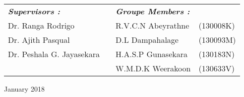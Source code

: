 \documentclass[12pt,a4paper,margin=1in]{article}
\begin{document}
\begin{titlepage}

\begin{flushleft}
\begin{tabular}{ l l l l}
\textbf{\textit{Supervisors :}} & &  \textbf{\textit{Groupe Members :}}\\[3pt]
Dr. Ranga Rodrigo & \hspace{20mm} & R.V.C.N Abeyrathne &(130008K)\\[2pt]
Dr. Ajith Pasqual & \hspace{20mm} & D.L Dampahalage & (130093M)\\[2pt]
Dr. Peshala G. Jayasekara & \hspace{20mm} & H.A.S.P Gunasekara & (130183N)\\[2pt]
\hspace{20mm} & \hspace{20mm} & W.M.D.K Weerakoon &(130633V)
\end{tabular}
\end{flushleft}

\vspace{2cm}
\fontsize{12pt}{12}\selectfont January 2018\\[1cm]


\vfill %

\end{titlepage}
\end{document}
